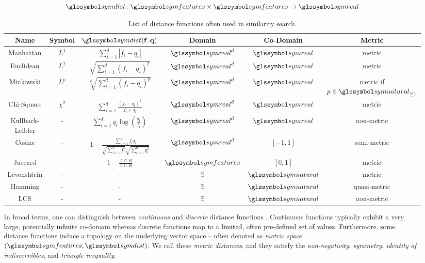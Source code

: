 \begin{equation}
    \label{eq:distance_function}
    \symdist \colon \symfeatures \times \symfeatures \rightarrow \symreal
\end{equation}

\begin{table}[hb]
    \caption{List of distance functions often used in similarity search.}
    \label{table:similarity_measures}
    \begin{tabular}{ | c | c | c | c | c | c |}
        \hline
        \textbf{Name} & \textbf{Symbol} &  $\symdist \mathbf{(f,q)}$ & \textbf{Domain} & \textbf{Co-Domain} & \textbf{Metric} \\
        \hline
        \hline 
        Manhattan & $L^1$ & $\sum_{i=1}^{d} | f_i - q_i |$ & $\symreal^d$ & $\symreal$ & metric \\ 
        \hline
        Euclidean & $L^2$ & $\sqrt{\sum_{i=1}^{d} (f_i - q_i)^2}$ & $\symreal^d$ & $\symreal$ & metric \\  
        \hline
        Minkowski & $L^p$ & $\sqrt[p]{\sum_{i=1}^{d} (f_i - q_i)^p}$ & $\symreal^d$ & $\symreal$ & metric if $p \in \symnatural_{\geq 1}$ \\ 
        \hline
        Chi-Square & $\chi^2$ & $\sum_{i=1}^{d} \frac{(f_i - q_i)^2}{f_i + q_i}$ & $\symreal^d$ & $\symreal$ & metric \\ 
        \hline
        Kullback-Leibler & - & $\sum_{i=1}^{d} q_i \log (\frac{q_i}{f_i})$ & $\symreal^d$ & $\symreal$ & non-metric \\ 
        \hline
        Cosine & - & $1 - \frac{\sum_{i=1}^{d} f_{i}q_{i}}{\sqrt{\sum_{i=1}^{d} f_i^2} \sqrt{\sum_{i=1}^{d} q_i^2}}$ & $\symreal^d$ & $[-1, 1]$ & semi-metric \\  
        \hline
        Jaccard & - & $1 - \frac{A \cap B}{A \cup B}$ & $\symfeatures$ & $[0, 1]$ & metric \\
        \hline
        Levenshtein \cite{Levensthtein:1965Binary} & - & - & $\mathbb{S}$ & $\symnatural$ & metric \\
        \hline
        Hamming & - & - &  $\mathbb{S}$ & $\symnatural$ & quasi-metric \\
        \hline
        LCS \cite{Hirschberg:1977Algorithms} & - & - &  $\mathbb{S}$ & $\symnatural$ & non-metric \\
        \hline
    \end{tabular}
\end{table}

In broad terms, one can distinguish between \emph{continuous} and \emph{discrete} distance functions \cite{Zezula:2006Similarity}. Continuous functions typically exhibit a very large, potentially infinite co-domain whereas discrete functions map to a limited, often pre-defined set of values. Furthermore, some distance functions induce a topology on the underlying vector space -- often denoted as  \emph{metric space} $(\symfeatures, \symdist)$. We call these \emph{metric distances}, and they satisfy the \emph{non-negativity}, \emph{symmetry}, \emph{identity of indiscernibles}, and \emph{triangle inequality}. 

